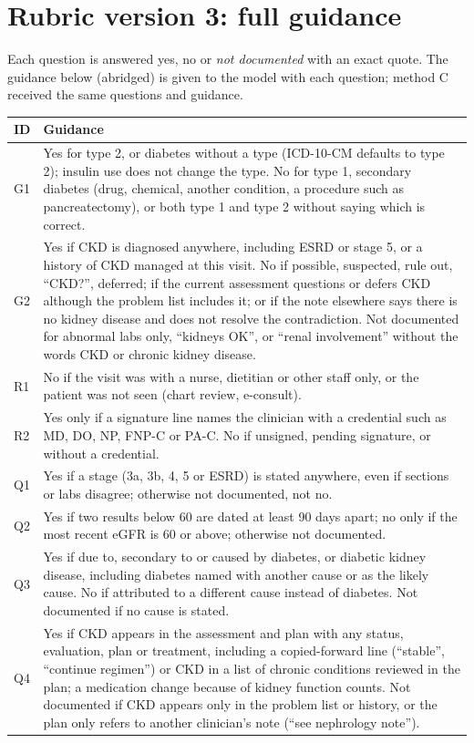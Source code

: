 \documentclass[10pt,letterpaper]{article}
\newcommand{\nd}{\textit{not documented}}
\begin{document}
\section{Rubric version 3: full guidance}\label{app:rubric}

Each question is answered yes, no or \nd{} with an exact quote. The guidance below (abridged) is given to the model with each question; method C received the same questions and guidance.

\begin{small}
\noindent\begin{tabularx}{\textwidth}{@{}p{0.6cm}L@{}}
\toprule
ID & Guidance \\
\midrule
G1 & Yes for type 2, or diabetes without a type (ICD-10-CM defaults to type 2); insulin use does not change the type. No for type 1, secondary diabetes (drug, chemical, another condition, a procedure such as pancreatectomy), or both type 1 and type 2 without saying which is correct. \\
G2 & Yes if CKD is diagnosed anywhere, including ESRD or stage 5, or a history of CKD managed at this visit. No if possible, suspected, rule out, ``CKD?'', deferred; if the current assessment questions or defers CKD although the problem list includes it; or if the note elsewhere says there is no kidney disease and does not resolve the contradiction. Not documented for abnormal labs only, ``kidneys OK'', or ``renal involvement'' without the words CKD or chronic kidney disease. \\
R1 & No if the visit was with a nurse, dietitian or other staff only, or the patient was not seen (chart review, e-consult). \\
R2 & Yes only if a signature line names the clinician with a credential such as MD, DO, NP, FNP-C or PA-C. No if unsigned, pending signature, or without a credential. \\
Q1 & Yes if a stage (3a, 3b, 4, 5 or ESRD) is stated anywhere, even if sections or labs disagree; otherwise not documented, not no. \\
Q2 & Yes if two results below 60 are dated at least 90 days apart; no only if the most recent eGFR is 60 or above; otherwise not documented. \\
Q3 & Yes if due to, secondary to or caused by diabetes, or diabetic kidney disease, including diabetes named with another cause or as the likely cause. No if attributed to a different cause instead of diabetes. Not documented if no cause is stated. \\
Q4 & Yes if CKD appears in the assessment and plan with any status, evaluation, plan or treatment, including a copied-forward line (``stable'', ``continue regimen'') or CKD in a list of chronic conditions reviewed in the plan; a medication change because of kidney function counts. Not documented if CKD appears only in the problem list or history, or the plan only refers to another clinician's note (``see nephrology note''). \\
\bottomrule
\end{tabularx}
\end{small}
\end{document}
